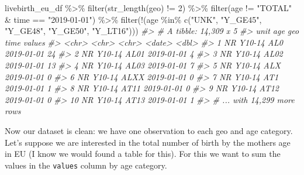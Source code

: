\documentclass[
]{article}
\newenvironment{Shaded}{\begin{snugshade}}{\end{snugshade}}
\newcommand{\CommentTok}[1]{\textcolor[rgb]{0.56,0.35,0.01}{\textit{#1}}}
\newcommand{\DecValTok}[1]{\textcolor[rgb]{0.00,0.00,0.81}{#1}}
\newcommand{\FunctionTok}[1]{\textcolor[rgb]{0.00,0.00,0.00}{#1}}
\newcommand{\NormalTok}[1]{#1}
\newcommand{\SpecialCharTok}[1]{\textcolor[rgb]{0.00,0.00,0.00}{#1}}
\newcommand{\StringTok}[1]{\textcolor[rgb]{0.31,0.60,0.02}{#1}}
\begin{document}
\begin{Shaded}
\begin{Highlighting}[]
\NormalTok{livebirth\_eu\_df }\SpecialCharTok{\%\textgreater{}\%} 
  \FunctionTok{filter}\NormalTok{(}\FunctionTok{str\_length}\NormalTok{(geo) }\SpecialCharTok{!=} \DecValTok{2}\NormalTok{) }\SpecialCharTok{\%\textgreater{}\%} 
  \FunctionTok{filter}\NormalTok{(age }\SpecialCharTok{!=} \StringTok{"TOTAL"} \SpecialCharTok{\&}\NormalTok{ time }\SpecialCharTok{==} \StringTok{"2019{-}01{-}01"}\NormalTok{) }\SpecialCharTok{\%\textgreater{}\%} 
  \FunctionTok{filter}\NormalTok{(}\SpecialCharTok{!}\NormalTok{(age }\SpecialCharTok{\%in\%} \FunctionTok{c}\NormalTok{(}\StringTok{"UNK"}\NormalTok{, }\StringTok{"Y\_GE45"}\NormalTok{, }\StringTok{"Y\_GE48"}\NormalTok{, }\StringTok{"Y\_GE50"}\NormalTok{, }\StringTok{"Y\_LT16"}\NormalTok{)))}
\CommentTok{\#\textgreater{} \# A tibble: 14,309 x 5}
\CommentTok{\#\textgreater{}    unit  age    geo   time       values}
\CommentTok{\#\textgreater{}    \textless{}chr\textgreater{} \textless{}chr\textgreater{}  \textless{}chr\textgreater{} \textless{}date\textgreater{}      \textless{}dbl\textgreater{}}
\CommentTok{\#\textgreater{}  1 NR    Y10{-}14 AL0   2019{-}01{-}01     24}
\CommentTok{\#\textgreater{}  2 NR    Y10{-}14 AL01  2019{-}01{-}01      4}
\CommentTok{\#\textgreater{}  3 NR    Y10{-}14 AL02  2019{-}01{-}01     13}
\CommentTok{\#\textgreater{}  4 NR    Y10{-}14 AL03  2019{-}01{-}01      7}
\CommentTok{\#\textgreater{}  5 NR    Y10{-}14 ALX   2019{-}01{-}01      0}
\CommentTok{\#\textgreater{}  6 NR    Y10{-}14 ALXX  2019{-}01{-}01      0}
\CommentTok{\#\textgreater{}  7 NR    Y10{-}14 AT1   2019{-}01{-}01      1}
\CommentTok{\#\textgreater{}  8 NR    Y10{-}14 AT11  2019{-}01{-}01      0}
\CommentTok{\#\textgreater{}  9 NR    Y10{-}14 AT12  2019{-}01{-}01      0}
\CommentTok{\#\textgreater{} 10 NR    Y10{-}14 AT13  2019{-}01{-}01      1}
\CommentTok{\#\textgreater{} \# ... with 14,299 more rows}
\end{Highlighting}
\end{Shaded}

Now our dataset is clean: we have one observation to each geo and age category. Let's suppose we are interested in the total number of birth by the mothers age in EU (I know we would found a table for this). For this we want to sum the values in the \texttt{values} column by age category.
\end{document}
